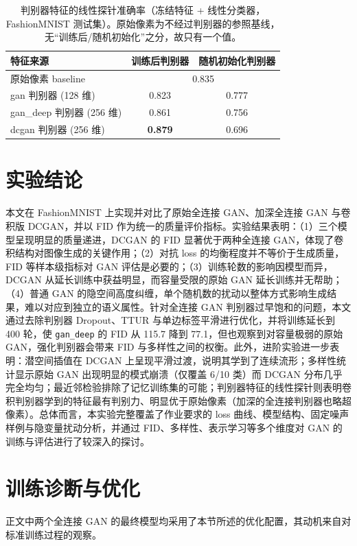 \documentclass[a4paper]{article}
\begin{document}
\begin{table}[H]
\centering
\caption{判别器特征的线性探针准确率（冻结特征 + 线性分类器，FashionMNIST 测试集）。原始像素为不经过判别器的参照基线，无“训练后/随机初始化”之分，故只有一个值。}
\begin{tabular}{lcc}
\toprule
特征来源 & 训练后判别器 & 随机初始化判别器 \\
\midrule
原始像素 baseline & \multicolumn{2}{c}{0.835} \\
gan 判别器 (128 维) & 0.823 & 0.777 \\
gan\_deep 判别器 (256 维) & 0.861 & 0.756 \\
dcgan 判别器 (256 维) & \textbf{0.879} & 0.696 \\
\bottomrule
\end{tabular}
\label{tab:probe}
\end{table}

\section{实验结论}
本文在 FashionMNIST 上实现并对比了原始全连接 GAN、加深全连接 GAN 与卷积版 DCGAN，并以 FID 作为统一的质量评价指标。实验结果表明：（1）三个模型呈现明显的质量递进，DCGAN 的 FID 显著优于两种全连接 GAN，体现了卷积结构对图像生成的关键作用；（2）对抗 loss 的均衡程度并不等价于生成质量，FID 等样本级指标对 GAN 评估是必要的；（3）训练轮数的影响因模型而异，DCGAN 从延长训练中获益明显，而容量受限的原始 GAN 延长训练并无帮助；（4）普通 GAN 的隐空间高度纠缠，单个随机数的扰动以整体方式影响生成结果，难以对应到独立的语义属性。针对全连接 GAN 判别器过早饱和的问题，本文通过去除判别器 Dropout、TTUR 与单边标签平滑进行优化，并将训练延长到 400 轮，使 \texttt{gan\_deep} 的 FID 从 115.7 降到 77.1，但也观察到对容量极弱的原始 GAN，强化判别器会带来 FID 与多样性之间的权衡。此外，进阶实验进一步表明：潜空间插值在 DCGAN 上呈现平滑过渡，说明其学到了连续流形；多样性统计显示原始 GAN 出现明显的模式崩溃（仅覆盖 6/10 类）而 DCGAN 分布几乎完全均匀；最近邻检验排除了记忆训练集的可能；判别器特征的线性探针则表明卷积判别器学到的特征最有判别力、明显优于原始像素（加深的全连接判别器也略超像素）。总体而言，本实验完整覆盖了作业要求的 loss 曲线、模型结构、固定噪声样例与隐变量扰动分析，并通过 FID、多样性、表示学习等多个维度对 GAN 的训练与评估进行了较深入的探讨。

\newpage

\appendix
\section{训练诊断与优化}
\label{sec:opt}
正文中两个全连接 GAN 的最终模型均采用了本节所述的优化配置，其动机来自对标准训练过程的观察。
\end{document}

